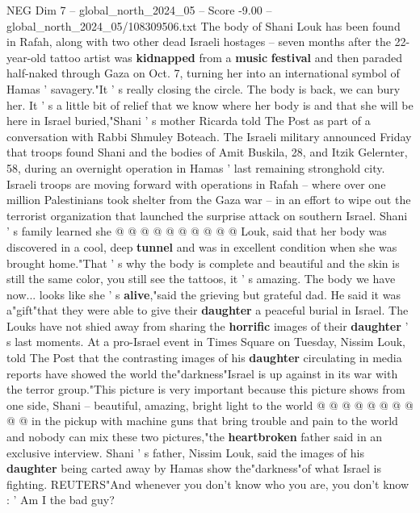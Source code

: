 \begin{textsample}{NEG Dim 7 – global\_north\_2024\_05 – Score -9.00 – global\_north\_2024\_05/108309506.txt}  \label{ex:f7_neg_182}
The body of Shani Louk has been found in Rafah, along with two other dead Israeli hostages -- seven months after the 22-year-old tattoo artist was \textbf{kidnapped} from a \textbf{music} \textbf{festival} and then paraded half-naked through Gaza on Oct. 7, turning her into an international symbol of Hamas ' savagery."It ' s really closing the circle.
The body is back, we can bury her.
It ' s a little bit of relief that we know where her body is and that she will be here in Israel buried,"Shani ' s mother Ricarda told The Post as part of a conversation with Rabbi Shmuley Boteach.
The Israeli military announced Friday that troops found Shani and the bodies of Amit Buskila, 28, and Itzik Gelernter, 58, during an overnight operation in Hamas ' last remaining stronghold city.
Israeli troops are moving forward with operations in Rafah -- where over one million Palestinians took shelter from the Gaza war -- in an effort to wipe out the terrorist organization that launched the surprise attack on southern Israel.
Shani ' s family learned she @ @ @ @ @ @ @ @ @ @ Louk, said that her body was discovered in a cool, deep \textbf{tunnel} and was in excellent condition when she was brought home."That ' s why the body is complete and beautiful and the skin is still the same color, you still see the tattoos, it ' s amazing.
The body we have now... looks like she ' s \textbf{alive},"said the grieving but grateful dad.
He said it was a"gift"that they were able to give their \textbf{daughter} a peaceful burial in Israel.
The Louks have not shied away from sharing the \textbf{horrific} images of their \textbf{daughter} ' s last moments.
At a pro-Israel event in Times Square on Tuesday, Nissim Louk, told The Post that the contrasting images of his \textbf{daughter} circulating in media reports have showed the world the"darkness"Israel is up against in its war with the terror group."This picture is very important because this picture shows from one side, Shani -- beautiful, amazing, bright light to the world @ @ @ @ @ @ @ @ @ @ in the pickup with machine guns that bring trouble and pain to the world and nobody can mix these two pictures,"the \textbf{heartbroken} father said in an exclusive interview.
Shani ' s father, Nissim Louk, said the images of his \textbf{daughter} being carted away by Hamas show the"darkness"of what Israel is fighting.
REUTERS"And whenever you don't know who you are, you don't know : ' Am I the bad guy?

\end{textsample}
